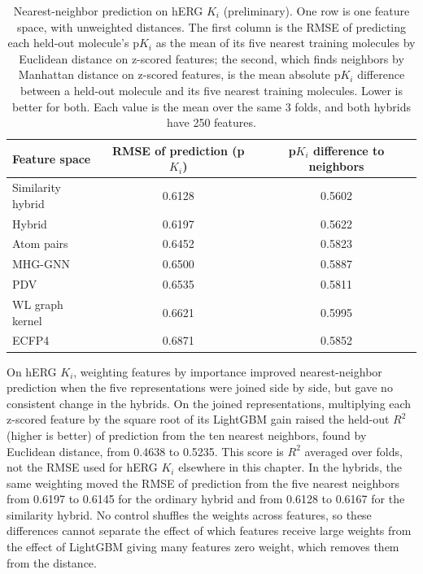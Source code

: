 \begin{table}[htbp]
\centering
\small
\begin{tabular}{@{}lcc@{}}
\toprule
Feature space & RMSE of prediction (p$K_i$) & p$K_i$ difference to neighbors \\
\midrule
Similarity hybrid & 0.6128 & 0.5602 \\
Hybrid & 0.6197 & 0.5622 \\
Atom pairs & 0.6452 & 0.5823 \\
MHG-GNN & 0.6500 & 0.5887 \\
PDV & 0.6535 & 0.5811 \\
WL graph kernel & 0.6621 & 0.5995 \\
ECFP4 & 0.6871 & 0.5852 \\
\bottomrule
\end{tabular}
\caption[Nearest-neighbor prediction on hERG $K_i$ (preliminary).]{Nearest-neighbor prediction on hERG $K_i$ (preliminary). One row is one feature space, with unweighted distances. The first column is the RMSE of predicting each held-out molecule's p$K_i$ as the mean of its five nearest training molecules by Euclidean distance on z-scored features; the second, which finds neighbors by Manhattan distance on z-scored features, is the mean absolute p$K_i$ difference between a held-out molecule and its five nearest training molecules. Lower is better for both. Each value is the mean over the same 3 folds, and both hybrids have 250 features.}
\label{tab:ch6prelim_knn}
\end{table}

On hERG $K_i$, weighting features by importance improved nearest-neighbor prediction when the five representations were joined side by side, but gave no consistent change in the hybrids. On the joined representations, multiplying each z-scored feature by the square root of its LightGBM gain raised the held-out $R^2$ (higher is better) of prediction from the ten nearest neighbors, found by Euclidean distance, from 0.4638 to 0.5235. This score is $R^2$ averaged over folds, not the RMSE used for hERG $K_i$ elsewhere in this chapter. In the hybrids, the same weighting moved the RMSE of prediction from the five nearest neighbors from 0.6197 to 0.6145 for the ordinary hybrid and from 0.6128 to 0.6167 for the similarity hybrid. No control shuffles the weights across features, so these differences cannot separate the effect of which features receive large weights from the effect of LightGBM giving many features zero weight, which removes them from the distance.


